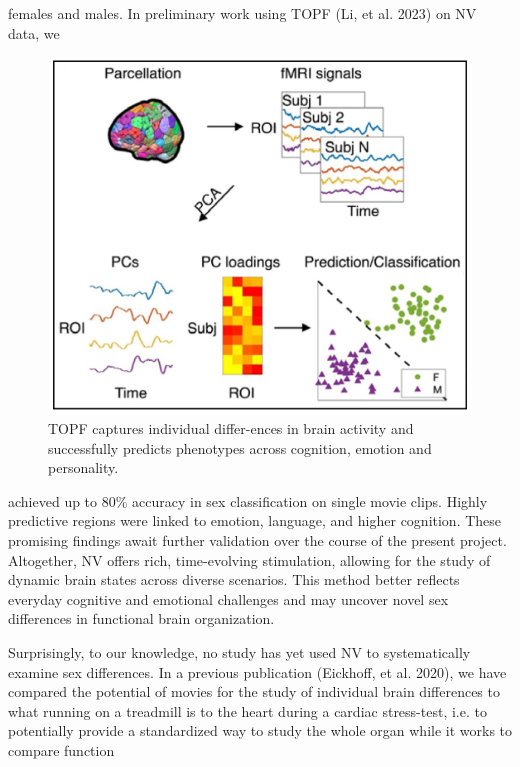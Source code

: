 \documentclass[11pt,a4paper]{article}
\begin{document}
females and males. In preliminary work using TOPF (Li, et al. 2023) on NV data, we 
\begin{figure} %
  \vspace{-10pt} %
  \includegraphics[width=\linewidth]{topf_neu.png}
  \caption{TOPF captures individual differ-ences in brain activity and successfully predicts phenotypes across cognition, emotion and personality.}
  \label{fig:topf}
\end{figure}
achieved up to 80\% accuracy in sex classification on single movie clips. Highly predictive regions were 
linked to emotion, language, and higher cognition. These promising findings await further validation over 
the course of the present project. Altogether, NV offers rich, time-evolving stimulation, allowing for the 
study of dynamic brain states across diverse scenarios. This method better reflects everyday cognitive and 
emotional challenges and may uncover novel sex differences in functional brain organization.
\par\vspace{-1\parskip}\noindent
Surprisingly, to our knowledge, no study has yet used NV to systematically examine sex differences. 
In a previous publication (Eickhoff, et al. 2020), we have compared the potential of movies for the study of 
individual brain differences to what running on a treadmill is to the heart during a cardiac stress-test, 
i.e. to potentially provide a standardized way to study the whole organ while it works to compare function 
\end{document}
